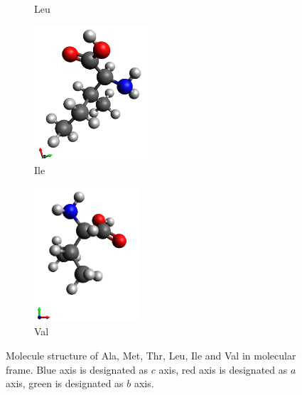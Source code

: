 \begin{figure}
\begin{subfigure}{.5\textwidth}
  \caption{Leu}
  \label{fig:sfig4}
\end{subfigure}
\begin{subfigure}{.5\textwidth}
  \centering
  \includegraphics[height=5cm]{Figures/Ile.png}
  \caption{Ile}
  \label{fig:sfig5}
\end{subfigure}
\begin{subfigure}{.5\textwidth}
  \centering
  \includegraphics[height=5cm]{Figures/Val.png}
  \caption{Val}
  \label{fig:sfig6}
\end{subfigure}
\caption{Molecule structure of Ala, Met, Thr, Leu, Ile and Val in molecular frame. Blue axis is designated as $c$ axis, red axis is designated as $a$ axis, green is designated as $b$ axis.}
\label{fig:aminacids}
\end{figure}

